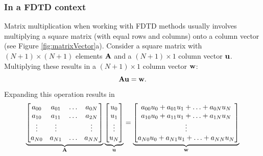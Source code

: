 \subsubsection{In a FDTD context}
Matrix multiplication when working with FDTD methods usually involves multiplying a square matrix (with equal rows and columns) onto a column vector (see Figure \ref{fig:matrixVector}a). Consider a square matrix with $(N+1)\times (N+1)$ elements $\mathbf{A}$ and a $(N+1) \times 1$ column vector $\mathbf{u}$. Multiplying these results in a $(N+1) \times 1$ column vector $\mathbf{w}$:
\begin{equation}
    \mathbf{A}\mathbf{u} = \mathbf{w}.
\end{equation}
Expanding this operation results in 
\begin{equation}
    \underbrace{\begin{bmatrix}
        a_{00} & a_{01} & \hdots & a_{0N}\\
        a_{10} & a_{11} & \hdots & a_{2N}\\
        \vdots & \vdots & &\vdots\\
        a_{N0} & a_{N1} & \hdots & a_{NN}
    \end{bmatrix}}_{\mathbf{A}}
    \underbrace{\begin{bmatrix}
        u_0\\
        u_1\\
        \vdots\\
        u_N
    \end{bmatrix}}_{\mathbf{u}} = 
    \underbrace{\begin{bmatrix}
        a_{00}u_0 + a_{01}u_1 + \hdots + a_{0N}u_N\\
        a_{10}u_0 + a_{11}u_1 + \hdots + a_{1N}u_N\\
        \vdots\\
        a_{N0}u_0 + a_{N1}u_1 + \hdots + a_{NN}u_N
    \end{bmatrix}}_{\mathbf{w}}
\end{equation}


